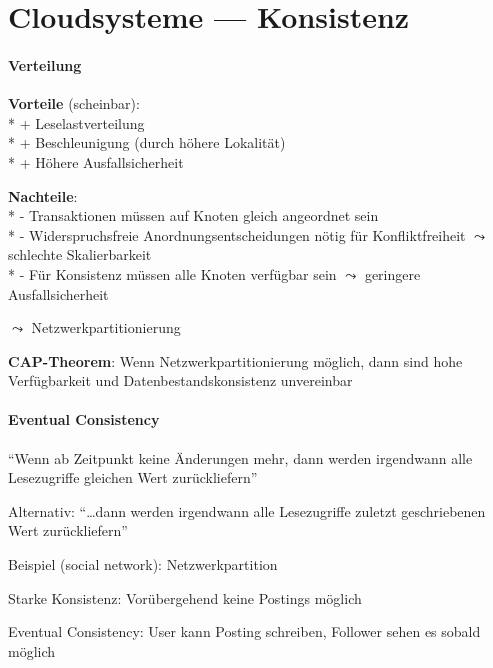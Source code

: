 \section{Cloudsysteme --- Konsistenz}
\label{sec:cloudkonsistenz}

\paragraph{Verteilung}
\begin{items}
	\item \textbf{Vorteile} (scheinbar): \\*
		+ Leselastverteilung \\*
		+ Beschleunigung (durch höhere Lokalität) \\*
		+ Höhere Ausfallsicherheit
	\item \textbf{Nachteile}: \\*
		- Transaktionen müssen auf Knoten gleich angeordnet sein \\*
		- Widerspruchsfreie Anordnungsentscheidungen nötig für Konfliktfreiheit \( \leadsto \) schlechte Skalierbarkeit \\*
		- Für Konsistenz müssen alle Knoten verfügbar sein \( \leadsto \) geringere Ausfallsicherheit
	\item \( \leadsto \) Netzwerkpartitionierung
	\item \textbf{CAP-Theorem}: Wenn Netzwerkpartitionierung möglich, dann sind hohe Verfügbarkeit und Datenbestandskonsistenz unvereinbar
\end{items}

\paragraph{Eventual Consistency}
\begin{items}
	\item ``Wenn ab Zeitpunkt keine Änderungen mehr, dann werden irgendwann alle Lesezugriffe gleichen Wert zurückliefern''
	\item Alternativ: ``\dots dann werden irgendwann alle Lesezugriffe zuletzt geschriebenen Wert zurückliefern''
	\item Beispiel (social network): Netzwerkpartition
	\begin{items}
		\item Starke Konsistenz: Vorübergehend keine Postings möglich
		\item Eventual Consistency: User kann Posting schreiben, Follower sehen es sobald möglich
	\end{items}
\end{items}

